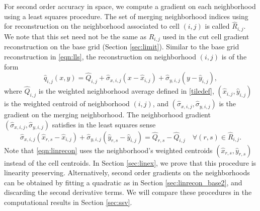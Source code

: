 For second order accuracy in space, we compute a gradient on each neighborhood using a least squares procedure.
The set of merging neighborhood indices using for reconstruction on the neighborhood associated to cell $(i,j)$ is called $\widehat R_{i,j}$.
We note that this set need not be the same as $R_{i,j}$ used in the cut cell gradient reconstruction on the base grid (Section \ref{sec:limit}). 
Similar to the base grid reconstruction in \eqref{eqn:lls}, the reconstruction on neighborhood $(i,j)$ is of the form
\begin{equation}\label{eq:qrecon}
\widehat{q}_{i,j}(x,y) = \widehat{Q}_{i, j} + \widehat{\sigma}_{x,i,j}(x - \widehat{x}_{i,j}) + \widehat{\sigma}_{y,i,j}(y - \widehat{y}_{i,j}),
\end{equation}
where $\widehat{Q}_{i, j}$ is the weighted neighborhood average defined in \eqref{tiledef}, $(\widehat{x}_{i,j},\widehat{y}_{i,j})$ is the weighted centroid of neighborhood $(i,j)$, and $(\widehat{\sigma}_{x,i,j},\widehat{\sigma}_{y,i,j})$ is 
the gradient on the merging neighborhood.
The neighborhood gradient $(\widehat{\sigma}_{x,i,j},\widehat{\sigma}_{y,i,j})$ satisfies in the least squares sense
\begin{equation}\label{eqn:linrecon}
\widehat{\sigma}_{x,i,j}(\widehat{x}_{r,s} - \widehat{x}_{i,j}) +
\widehat{\sigma}_{y,i,j}(\widehat{y}_{r,s} - \widehat{y}_{i,j})=
\widehat{Q}_{r,s} - \widehat{Q}_{i, j} \quad \forall (r,s) \in \widehat{R}_{i,j}.
\end{equation}
Note that \eqref{eqn:linrecon} uses the neighborhood's weighted centroids $(\widehat{x}_{r,s},\widehat{y}_{r,s})$ instead of the cell centroids.  In Section \ref{sec:linex}, we prove that this procedure is linearity preserving.
Alternatively, second order gradients on the neighborhoods can be obtained by fitting a quadratic
as in Section \ref{sec:linrecon_base2}, and discarding the second derivative terms.
We will compare these procedures in the computational results in Section \ref{sec:ssv}.





